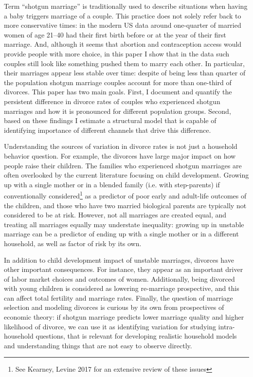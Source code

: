 \documentclass[12pt,letter]{article}
\begin{document}
Term ``shotgun marriage'' is traditionally used to describe situations when having a baby triggers marriage of a couple. This practice does not solely refer back to more conservative times: in the modern US data around one-quarter of married women of age 21--40 had their first birth before or at the year of their first marriage. And, although it seems that abortion and contraception access would provide people with more choice, in this paper I show that in the data such couples still look like something pushed them to marry each other. In particular, their marriages appear less stable over time: despite of being less than quarter of the population shotgun marriage couples account for more than one-third of divorces. This paper has two main goals. First, I document and quantify the persistent difference in divorce rates of couples who experienced shotgun marriages and how it is pronounced for different population groups. Second, based on these findings I estimate a structural model that is capable of identifying importance of different channels that drive this difference.

Understanding the sources of variation in divorce rates is not just a household behavior question. For example, the divorces have large major impact on how people raise their children. The families who experienced shotgun marriages are often overlooked by the current literature focusing on child development. Growing up with a single mother or in a blended family (i.e. with step-parents) if conventionally considered\footnote{See Kearney, Levine 2017\nocite{kearney} for an extensive review of these issues} as a predictor of poor early and adult-life outcomes of the children, and those who have two married biological parents are typically not considered to be at risk. However, not all marriages are created equal, and treating all marriages equally may understate inequality: growing up in unstable marriage can be a predictor of ending up with a single mother or in a different household, as well as factor of risk by its own.

In addition to child development impact of unstable marriages, divorces have other important consequences. For instance, they appear as an important driver of labor market choices and outcomes of women. Additionally, being divorced with young children is considered as lowering re-marriage prospective, and this can affect total fertility and marriage rates. Finally, the question of marriage selection and modeling divorces is curious by its own from prospectives of economic theory: if shotgun marriage predicts lower marriage quality and higher likelihood of divorce, we can use it as identifying variation for studying intra-household questions, that is relevant for developing realistic household models and understanding things that are not easy to observe directly.
\end{document}
